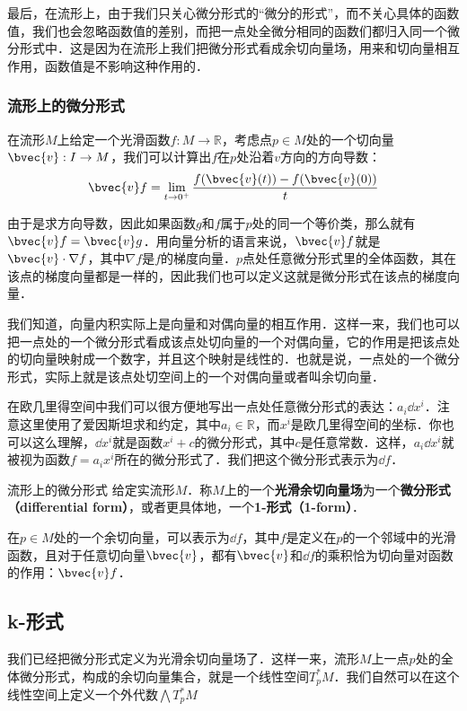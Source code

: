 最后，在流形上，由于我们只关心微分形式的“微分的形式”，而不关心具体的函数值，我们也会忽略函数值的差别，而把一点处全微分相同的函数们都归入同一个微分形式中．这是因为在流形上我们把微分形式看成余切向量场，用来和切向量相互作用，函数值是不影响这种作用的．

\subsubsection{流形上的微分形式}

在流形$M$上给定一个光滑函数$f:M\rightarrow \mathbb{R}$，考虑点$p\in M$处的一个切向量$\bvec{v}:I\rightarrow M$，我们可以计算出$f$在$p$处沿着$v$方向的方向导数：
\begin{equation}
\bvec{v}f=\lim\limits_{t\rightarrow 0^+}\frac{f(\bvec{v}(t))-f(\bvec{v}(0))}{t}
\end{equation}

由于是求方向导数，因此如果函数$g$和$f$属于$p$处的同一个等价类，那么就有$\bvec{v}f=\bvec{v}g$．用向量分析的语言来说，$\bvec{v}f$就是$\bvec{v}\cdot\nabla f$，其中$\nabla f$是$f$的梯度向量．$p$点处任意微分形式里的全体函数，其在该点的梯度向量都是一样的，因此我们也可以定义这就是微分形式在该点的梯度向量．

我们知道，向量内积实际上是向量和对偶向量的相互作用．这样一来，我们也可以把一点处的一个微分形式看成该点处切向量的一个对偶向量，它的作用是把该点处的切向量映射成一个数字，并且这个映射是线性的．也就是说，一点处的一个微分形式，实际上就是该点处切空间上的一个对偶向量或者叫余切向量．

在欧几里得空间中我们可以很方便地写出一点处任意微分形式的表达：$a_i\dd x^i$．注意这里使用了爱因斯坦求和约定，其中$a_i\in\mathbb{R}$，而$x^i$是欧几里得空间的坐标．你也可以这么理解，$\dd x^i$就是函数$x^i+c$的微分形式，其中$c$是任意常数．这样，$a_i\dd x^i$就被视为函数$f=a_ix^i$所在的微分形式了．我们把这个微分形式表示为$\dd f$．

\begin{definition}{流形上的微分形式}
给定实流形$M$．称$M$上的一个\textbf{光滑余切向量场}为一个\textbf{微分形式（differential form）}，或者更具体地，一个\textbf{1-形式（1-form）}．

在$p\in M$处的一个余切向量，可以表示为$\dd f$，其中$f$是定义在$p$的一个邻域中的光滑函数，且对于任意切向量$\bvec{v}$，都有$\bvec{v}$和$\dd f$的乘积恰为切向量对函数的作用：$\bvec{v}f$．
\end{definition}

\subsection{k-形式}

我们已经把微分形式定义为光滑余切向量场了．这样一来，流形$M$上一点$p$处的全体微分形式，构成的余切向量集合，就是一个线性空间$T^*_pM$．我们自然可以在这个线性空间上定义一个外代数$\bigwedge T^*_pM$








